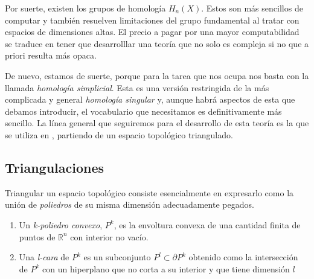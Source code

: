 Por suerte, existen los grupos de homología $H_n(X)$. Estos son más sencillos de computar y también resuelven limitaciones del grupo fundamental al tratar con espacios de dimensiones altas. El precio a pagar por una mayor computabilidad se traduce en tener que desarrolllar una teoría que no solo es compleja si no que a priori resulta más opaca.

De nuevo, estamos de suerte, porque para la tarea que nos ocupa nos basta con la llamada \textit{homología simplicial}. Esta es una versión restringida de la más complicada y general \textit{homología singular} y, aunque habrá aspectos de esta que debamos introducir, el vocabulario que necesitamos es definitivamente más sencillo. La línea general que seguiremos para el desarrollo de esta teoría es la que se utiliza en \cite{munoz2021}, partiendo de un espacio topológico triangulado.


\bigskip

\subsection{Triangulaciones}
\label{subsec:triangulaciones}

Triangular un espacio topológico consiste esencialmente en expresarlo como la unión de \textit{poliedros} de su misma dimensión adecuadamente pegados.

\begin{definition} \hfill

    \begin{enumerate}[label=(\roman*)]
        \item  Un \textit{k-poliedro convexo}, $P^k$, es la envoltura convexa de una cantidad finita de puntos de $\mathbb{R}^n$ con interior no vacío.
        \item Una \textit{l-cara} de $P^k$ es un subconjunto $P^l\subset \partial P^k$ obtenido como la intersección de $P^k$ con un hiperplano que no corta a su interior y que tiene dimensión $l$
    \end{enumerate}
   
\end{definition}

\bigskip

